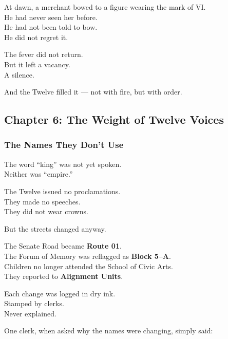 \documentclass[12pt]{article}
\begin{document}
At dawn, a merchant bowed to a figure wearing the mark of VI.\\
He had never seen her before.\\
He had not been told to bow.\\
He did not regret it.

\vspace{1em}

The fever did not return.\\
But it left a vacancy.\\
A silence.

And the Twelve filled it — not with fire, but with order.

\newpage

\subsection{Chapter 6: The Weight of Twelve Voices}

\vspace{.5in}

\subsubsection{The Names They Don’t Use}

The word “king” was not yet spoken.\\
Neither was “empire.”

The Twelve issued no proclamations.\\
They made no speeches.\\
They did not wear crowns.

But the streets changed anyway.

\vspace{1em}

The Senate Road became \textbf{Route 01}.\\
The Forum of Memory was reflagged as \textbf{Block 5–A}.\\
Children no longer attended the School of Civic Arts.\\
They reported to \textbf{Alignment Units}.

Each change was logged in dry ink.\\
Stamped by clerks.\\
Never explained.

\vspace{1em}

One clerk, when asked why the names were changing, simply said:
\end{document}

